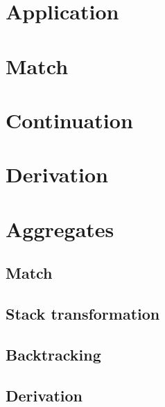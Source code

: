 

%

\section{Application}



\section{Match}





\section{Continuation}




\section{Derivation}





\section{Aggregates}
\subsection{Match}



\subsection{Stack transformation}

\subsection{Backtracking}



\subsection{Derivation}

